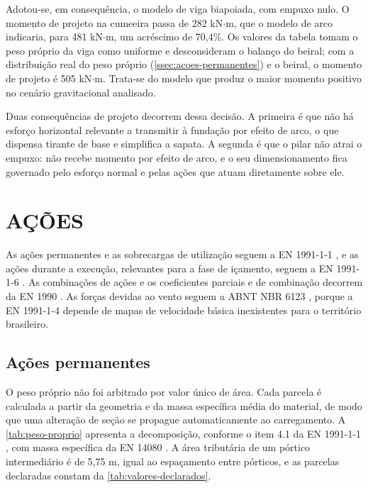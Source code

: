 Adotou-se, em consequência, o modelo de viga biapoiada, com empuxo nulo. O
momento de projeto na cumeeira passa de 282 kN$\cdot$m, que o modelo de arco
indicaria, para 481 kN$\cdot$m, um acréscimo de 70,4\%. Os valores da tabela
tomam o peso próprio da viga como uniforme e desconsideram o balanço do beiral;
com a distribuição real do peso próprio (\autoref{ssec:acoes-permanentes}) e o beiral, o
momento de projeto é 505 kN$\cdot$m. Trata-se do modelo que produz o maior
momento positivo no cenário gravitacional analisado.

Duas consequências de projeto decorrem dessa decisão. A primeira é que não há
esforço horizontal relevante a transmitir à fundação por efeito de arco, o que
dispensa tirante de base e simplifica a sapata. A segunda é que o pilar não atrai o
empuxo: não recebe momento por efeito de arco, e o seu dimensionamento fica
governado pelo esforço normal e pelas ações que atuam diretamente sobre ele.

\section{AÇÕES}\label{sec:acoes}

As ações permanentes e as sobrecargas de utilização seguem a
EN 1991-1-1 \cite{EN1991-1-1:2002}, e as ações durante a execução, relevantes
para a fase de içamento, seguem a EN 1991-1-6 \cite{EN1991-1-6:2005}. As
combinações de ações e os coeficientes parciais e de combinação decorrem da
EN 1990 \cite{EN1990:2002}. As forças devidas ao vento seguem a ABNT NBR 6123 \cite{NBR6123:2023},
porque a EN 1991-1-4 \cite{EN1991-1-4:2005} depende de mapas de velocidade básica
inexistentes para o território brasileiro.

\subsection{Ações permanentes}\label{ssec:acoes-permanentes}

O peso próprio não foi arbitrado por valor único de área. Cada parcela é
calculada a partir da geometria e da massa específica média do material, de modo
que uma alteração de seção se propague automaticamente ao carregamento. A
\autoref{tab:peso-proprio} apresenta a decomposição, conforme o item 4.1 da
EN 1991-1-1 \cite{EN1991-1-1:2002}, com massa específica da
EN 14080 \cite{EN14080:2013}. A área tributária de um pórtico intermediário é de
5,75 m, igual ao espaçamento entre pórticos, e as parcelas declaradas constam da
\autoref{tab:valores-declarados}.

